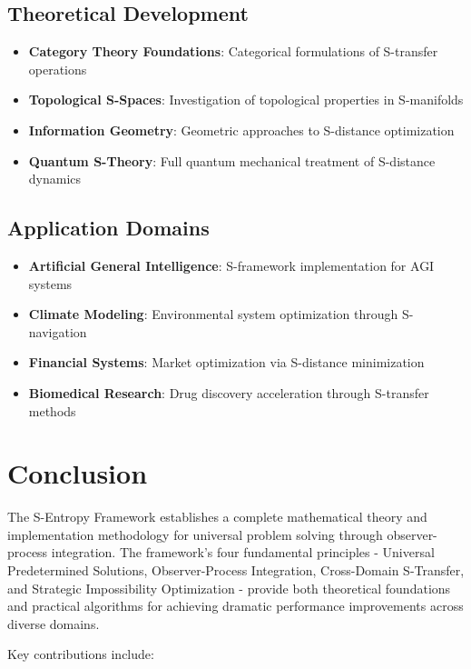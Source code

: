 \documentclass[11pt]{article}
\begin{document}
\subsection{Theoretical Development}

\begin{itemize}
\item \textbf{Category Theory Foundations}: Categorical formulations of S-transfer operations
\item \textbf{Topological S-Spaces}: Investigation of topological properties in S-manifolds
\item \textbf{Information Geometry}: Geometric approaches to S-distance optimization
\item \textbf{Quantum S-Theory}: Full quantum mechanical treatment of S-distance dynamics
\end{itemize}

\subsection{Application Domains}

\begin{itemize}
\item \textbf{Artificial General Intelligence}: S-framework implementation for AGI systems
\item \textbf{Climate Modeling}: Environmental system optimization through S-navigation
\item \textbf{Financial Systems}: Market optimization via S-distance minimization
\item \textbf{Biomedical Research}: Drug discovery acceleration through S-transfer methods
\end{itemize}

\section{Conclusion}

The S-Entropy Framework establishes a complete mathematical theory and implementation methodology for universal problem solving through observer-process integration. The framework's four fundamental principles - Universal Predetermined Solutions, Observer-Process Integration, Cross-Domain S-Transfer, and Strategic Impossibility Optimization - provide both theoretical foundations and practical algorithms for achieving dramatic performance improvements across diverse domains.

Key contributions include:
\end{document}
